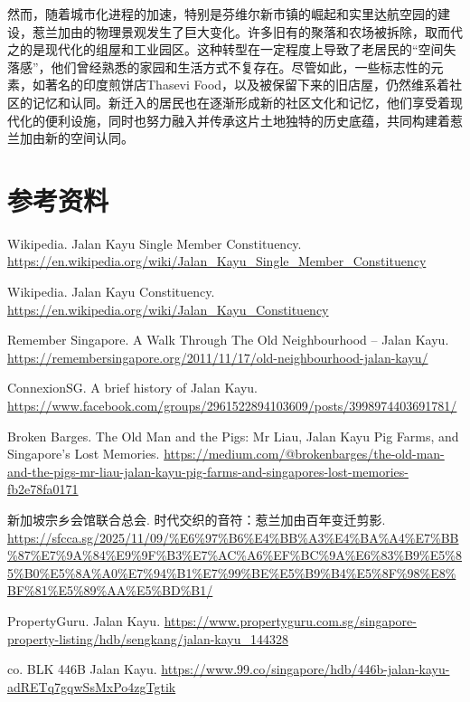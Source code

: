 \documentclass[11pt,a4paper,twoside,openany]{book}
\begin{document}
然而，随着城市化进程的加速，特别是芬维尔新市镇的崛起和实里达航空园的建设，惹兰加由的物理景观发生了巨大变化。许多旧有的聚落和农场被拆除，取而代之的是现代化的组屋和工业园区。这种转型在一定程度上导致了老居民的“空间失落感”，他们曾经熟悉的家园和生活方式不复存在。尽管如此，一些标志性的元素，如著名的印度煎饼店Thasevi Food，以及被保留下来的旧店屋，仍然维系着社区的记忆和认同。新迁入的居民也在逐渐形成新的社区文化和记忆，他们享受着现代化的便利设施，同时也努力融入并传承这片土地独特的历史底蕴，共同构建着惹兰加由新的空间认同。

\section*{参考资料}
\begin{enumerate}[label={[\arabic*]},leftmargin=*,topsep=2pt,itemsep=1pt,parsep=0pt]
  \item Wikipedia. Jalan Kayu Single Member Constituency. \url{https://en.wikipedia.org/wiki/Jalan_Kayu_Single_Member_Constituency}
  \item Wikipedia. Jalan Kayu Constituency. \url{https://en.wikipedia.org/wiki/Jalan_Kayu_Constituency}
  \item Remember Singapore. A Walk Through The Old Neighbourhood – Jalan Kayu. \url{https://remembersingapore.org/2011/11/17/old-neighbourhood-jalan-kayu/}
  \item ConnexionSG. A brief history of Jalan Kayu. \url{https://www.facebook.com/groups/2961522894103609/posts/3998974403691781/}
  \item Broken Barges. The Old Man and the Pigs: Mr Liau, Jalan Kayu Pig Farms, and Singapore’s Lost Memories. \url{https://medium.com/@brokenbarges/the-old-man-and-the-pigs-mr-liau-jalan-kayu-pig-farms-and-singapores-lost-memories-fb2e78fa0171}
  \item 新加坡宗乡会馆联合总会. 时代交织的音符：惹兰加由百年变迁剪影. \url{https://sfcca.sg/2025/11/09/%E6%97%B6%E4%BB%A3%E4%BA%A4%E7%BB%87%E7%9A%84%E9%9F%B3%E7%AC%A6%EF%BC%9A%E6%83%B9%E5%85%B0%E5%8A%A0%E7%94%B1%E7%99%BE%E5%B9%B4%E5%8F%98%E8%BF%81%E5%89%AA%E5%BD%B1/}
  \item PropertyGuru. Jalan Kayu. \url{https://www.propertyguru.com.sg/singapore-property-listing/hdb/sengkang/jalan-kayu_144328}
  \item co. BLK 446B Jalan Kayu. \url{https://www.99.co/singapore/hdb/446b-jalan-kayu-adRETq7gqwSsMxPo4zgTgtik}
\end{enumerate}
\end{document}
